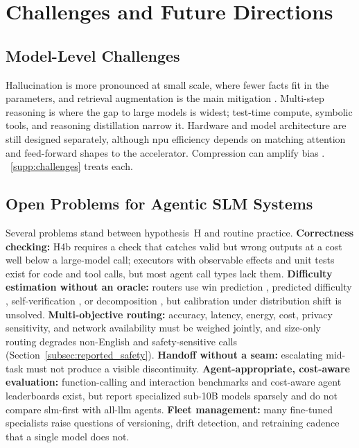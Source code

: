 
\section{Challenges and Future Directions}
\label{sec:challenges}

\subsection{Model-Level Challenges}
\label{subsec:challenges_model}
Hallucination is more pronounced at small scale, where fewer facts fit in the parameters, and retrieval augmentation is the main mitigation \citep{zhang2023siren,lewis2020rag}. Multi-step reasoning is where the gap to large models is widest; test-time compute, symbolic tools, and reasoning distillation narrow it. Hardware and model architecture are still designed separately, although \gls{npu} efficiency depends on matching attention and feed-forward shapes to the accelerator. Compression can amplify bias \citep{blodgett2020language,kurz2025pruning_vs_quant}. \suppsec~\ref{supp:challenges} treats each.

\subsection{Open Problems for Agentic SLM Systems}
\label{subsec:challenges_routing}

Several problems stand between hypothesis~H and routine practice. \textbf{Correctness checking:} H4b requires a check that catches valid but wrong outputs at a cost well below a large-model call; executors with observable effects and unit tests exist for code and tool calls, but most agent call types lack them. \textbf{Difficulty estimation without an oracle:} routers use win prediction \citep{ong2024routellm}, predicted difficulty \citep{ding2024hybridllm}, self-verification \citep{aggarwal2024automix}, or decomposition \citep{division_of_thoughts_2025}, but calibration under distribution shift is unsolved. \textbf{Multi-objective routing:} accuracy, latency, energy, cost, privacy sensitivity, and network availability must be weighed jointly, and size-only routing degrades non-English and safety-sensitive calls (Section~\ref{subsec:reported_safety}). \textbf{Handoff without a seam:} escalating mid-task must not produce a visible discontinuity. \textbf{Agent-appropriate, cost-aware evaluation:} function-calling and interaction benchmarks \citep{patil2025bfcl,yao2024taubench,barres2025tau2} and cost-aware agent leaderboards \citep{kapoor2025hal} exist, but report specialized sub-10B models sparsely and do not compare \gls{slm}-first with all-\gls{llm} agents. \textbf{Fleet management:} many fine-tuned specialists raise questions of versioning, drift detection, and retraining cadence that a single model does not.

